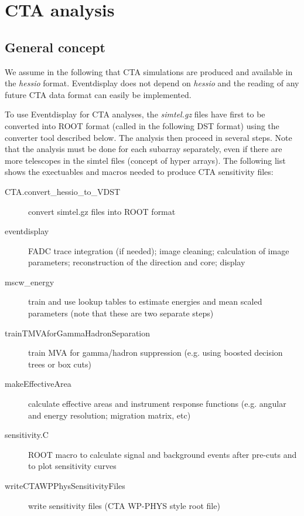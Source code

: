 \documentclass[titlepage,a4paper,twoside,11pt]{report}
\begin{document}
%
%

\chapter{CTA analysis}

\section{General concept}

We assume in the following that CTA simulations are produced and available in the {\it hessio} format. 
Eventdisplay does not depend on {\it hessio} and the reading of any future CTA data format can easily be implemented.

To use Eventdisplay for CTA analyses, the {\it simtel.gz} files have first to be converted into ROOT format (called in the following DST format) using the converter tool described below. 
The analysis then proceed in several steps.
Note that the analysis must be done for each subarray separately, even if there are more telescopes in the simtel files (concept of hyper arrays).
The following list shows the exectuables and macros needed to produce CTA sensitivity files:

\begin{description}
\item[CTA.convert\_hessio\_to\_VDST]
        convert simtel.gz files into ROOT format

\item[eventdisplay]
	FADC trace integration (if needed); image cleaning; calculation of image parameters; reconstruction of the direction and core; display

\item[mscw\_energy]
        train and use lookup tables to estimate energies and mean scaled parameters (note that these are two separate steps)
        
\item[trainTMVAforGammaHadronSeparation]
        train MVA for gamma/hadron suppression (e.g. using boosted decision trees or box cuts)

\item[makeEffectiveArea]
        calculate effective areas and instrument response functions (e.g. angular and energy resolution; migration matrix, etc)

\item[sensitivity.C]
        ROOT macro to calculate signal and background events after pre-cuts and to plot sensitivity curves

\item[writeCTAWPPhysSensitivityFiles]
        write sensitivity files (CTA WP-PHYS style root file)
        
\end{description}
\end{document}
